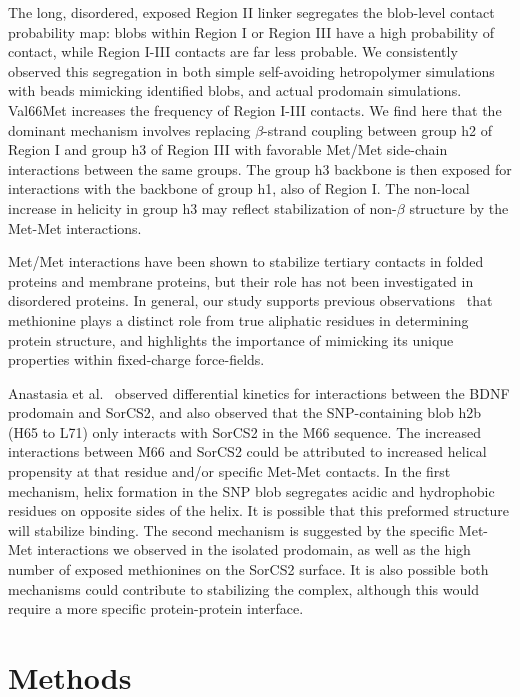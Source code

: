\documentclass[10pt,letterpaper]{article}
\begin{document}
The long, disordered, exposed Region II linker segregates the blob-level contact probability map: blobs within Region I or Region III have a high probability of contact, while Region I-III contacts are far less probable. We consistently observed this segregation in both simple self-avoiding hetropolymer simulations with beads mimicking identified blobs, and actual prodomain simulations. Val66Met increases the frequency of Region I-III contacts. We find here that the dominant mechanism involves replacing $\beta$-strand coupling between group h2 of Region I and group h3 of Region III with favorable Met/Met side-chain interactions between the same groups. The group h3 backbone is then exposed for interactions with the backbone of group h1, also of Region I. The non-local increase in helicity in group h3 may reflect stabilization of non-$\beta$ structure by the Met-Met interactions.

Met/Met interactions have been shown to stabilize tertiary contacts in folded proteins and membrane proteins, but their role has not been investigated in disordered proteins. In general, our study supports previous observations~\cite{Gomez-Tamayo2016, Lim2019} that methionine plays a distinct role from true aliphatic residues in determining protein structure, and highlights the importance of mimicking its unique properties within fixed-charge force-fields. 

Anastasia et al.~\cite{Anastasia2013} observed differential kinetics for interactions between the BDNF prodomain and SorCS2, and also observed that the SNP-containing blob h2b (H65 to L71) only interacts with SorCS2 in the M66 sequence. The increased interactions between M66 and SorCS2 could be attributed to increased helical propensity at that residue and/or specific Met-Met contacts. In the first mechanism, helix formation in the SNP blob segregates acidic and hydrophobic residues on opposite sides of the helix. It is possible that this preformed structure will stabilize binding. The second mechanism is suggested by the specific Met-Met interactions we observed in the isolated prodomain, as well as the high number of exposed methionines on the SorCS2 surface. It is also possible both mechanisms could contribute to stabilizing the complex, although this would require a more specific protein-protein interface. 

\section*{Methods}
\end{document}
